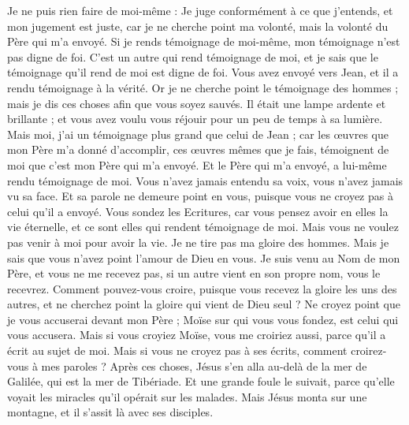 \begin{multicols}{2}
Je ne puis rien faire de moi-même : Je juge conformément à ce que j'entends, et mon jugement est juste, car je ne cherche point ma volonté, mais la volonté du Père qui m'a envoyé.
Si je rends témoignage de moi-même, mon témoignage n'est pas digne de foi.
C'est un autre qui rend témoignage de moi, et je sais que le témoignage qu'il rend de moi est digne de foi.
Vous avez envoyé vers Jean, et il a rendu témoignage à la vérité.
Or je ne cherche point le témoignage des hommes ; mais je dis ces choses afin que vous soyez sauvés.
Il était une lampe ardente et brillante ; et vous avez voulu vous réjouir pour un peu de temps à sa lumière.
Mais moi, j'ai un témoignage plus grand que celui de Jean ; car les œuvres que mon Père m'a donné d'accomplir, ces œuvres mêmes que je fais, témoignent de moi que c'est mon Père qui m'a envoyé.
Et le Père qui m'a envoyé, a lui-même rendu témoignage de moi. Vous n'avez jamais entendu sa voix, vous n'avez jamais vu sa face.
Et sa parole ne demeure point en vous, puisque vous ne croyez pas à celui qu'il a envoyé.
Vous sondez les Ecritures, car vous pensez avoir en elles la vie éternelle, et ce sont elles qui rendent témoignage de moi.
Mais vous ne voulez pas venir à moi pour avoir la vie.
Je ne tire pas ma gloire des hommes.
Mais je sais que vous n'avez point l'amour de Dieu en vous.
Je suis venu au Nom de mon Père, et vous ne me recevez pas, si un autre vient en son propre nom, vous le recevrez.
Comment pouvez-vous croire, puisque vous recevez la gloire les uns des autres, et ne cherchez point la gloire qui vient de Dieu seul ?
Ne croyez point que je vous accuserai devant mon Père ; Moïse sur qui vous vous fondez, est celui qui vous accusera.
Mais si vous croyiez Moïse, vous me croiriez aussi, parce qu'il a écrit au sujet de moi.
Mais si vous ne croyez pas à ses écrits, comment croirez-vous à mes paroles ?
\VerseOne{}Après ces choses, Jésus s'en alla au-delà de la mer de Galilée, qui est la mer de Tibériade.
Et une grande foule le suivait, parce qu'elle voyait les miracles qu'il opérait sur les malades.
Mais Jésus monta sur une montagne, et il s'assit là avec ses disciples.

\end{multicols}
